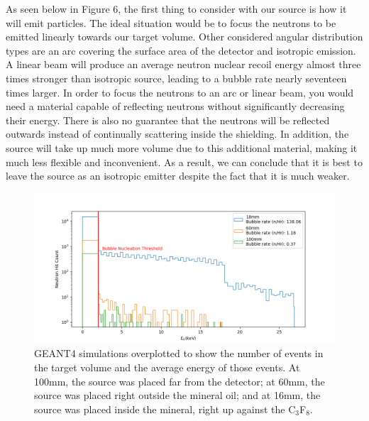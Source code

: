 \documentclass[%
12pt,
twoside,
reprint,
amsmath,amssymb,
aps,
]{article}
\begin{document}
	\par As seen below in Figure 6, the first thing to consider with our source is how it will emit particles. The ideal situation would be to focus the neutrons to be emitted linearly towards our target volume. Other considered angular distribution types are an arc covering the surface area of the detector and isotropic emission. A linear beam will produce an average neutron nuclear recoil energy almost three times stronger than isotropic source, leading to a bubble rate nearly seventeen times larger. In order to focus the neutrons to an arc or linear beam, you would need a material capable of reflecting neutrons without significantly decreasing their energy. There is also no guarantee that the neutrons will be reflected outwards instead of continually scattering inside the shielding. In addition, the source will take up much more volume due to this additional material, making it much less flexible and inconvenient. As a result, we can conclude that it is best to leave the source as an isotropic emitter despite the fact that it is much weaker.

	\begin{figure}[!b]
		\includegraphics[scale = 0.6, center]{Images/distance_log.png}
		\caption{\label{tab:table-name} GEANT4 simulations overplotted to show the number of events in the target volume and the average energy of those events. At 100mm, the source was placed far from the detector; at 60mm, the source was placed right outside the mineral oil; and at 16mm, the source was placed inside the mineral, right up against the C$_{3}$F$_{8}$.}
	\end{figure}
	
\end{document}
